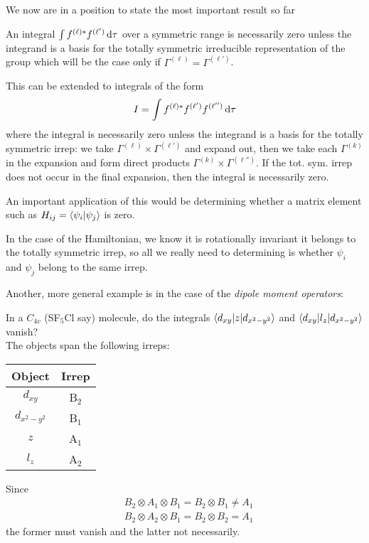 We now are in a position to state the most important result so far
\begin{thrm}
\label{zerointegral}
An integral $\int f^{(\ell)*}f^{(\ell')}\dif\tau$ over a symmetric range is 
necessarily zero unless the integrand is a basis for the totally symmetric 
irreducible representation of the group which will be the case only if 
$\Gamma^{(\ell)}=\Gamma^{(\ell')}$. 
\end{thrm}
This can be extended to integrals of the form
\begin{equation}
I=\int f^{(\ell)*}f^{(\ell')}f^{(\ell'')}\dif\tau
\end{equation}
where the integral is necessarily zero unless the integrand is a basis for the 
totally symmetric irrep: we take $\Gamma^{(\ell)}\times\Gamma^{(\ell')}$ and 
expand out, then we take each $\Gamma^{(k)}$ in the expansion and form direct 
products $\Gamma^{(k)}\times\Gamma^{(\ell'')}$. If the tot. sym. irrep does not 
occur in the final expansion, then the integral is necessarily zero. \par
An important application of this would be determining whether a matrix element such as $H_{ij}=\langle \psi_i |\psi_j  \rangle $ is zero. \par
In the case of the Hamiltonian, we know it is rotationally invariant \ie it belongs to the totally symmetric irrep, so all we really need to determining is whether $\psi_i$ and $\psi_j$ belong to the same irrep. \par
Another, more general example is in the case of the \emph{dipole moment operators}:\par
In a $C_{4v}$ (SF$_5$Cl say) molecule, do the integrals $\langle d_{xy}|z |d_{x^2-y^2}  \rangle $ and $\langle d_{xy}|l_z |d_{x^2-y^2}  \rangle $ vanish?\\
The objects span the following irreps:
\begin{center}
	\begin{tabular}{c|c}
		Object & Irrep\\
		\hline
		$d_{xy}$ & B$_2$\\
		$d_{x^2-y^2}$ & B$_1$\\
		$z$ & A$_1$\\
		$l_z$ & A$_2$
	\end{tabular}
\end{center}
Since
\begin{equation}
\begin{aligned}
&B_2\otimes A_1\otimes B_1=B_2\otimes B_1\neq A_1\\
&B_2\otimes A_2\otimes B_1=B_2\otimes B_2=A_1
\end{aligned}
\end{equation}
the former must vanish and the latter not necessarily.
